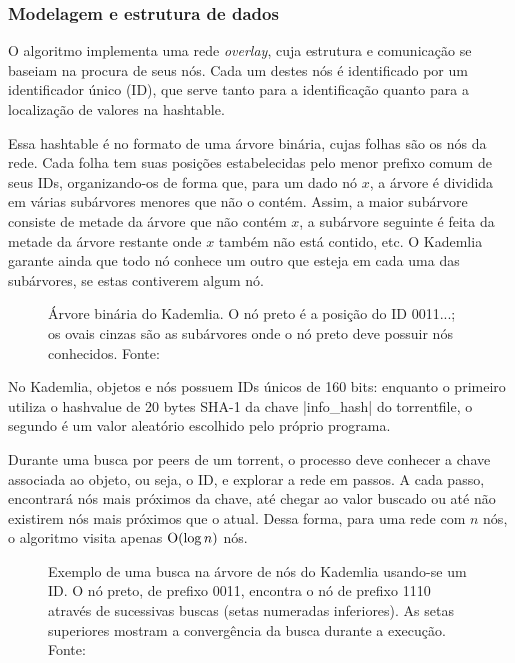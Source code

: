 
\subsubsection*{Modelagem e estrutura de dados}

O algoritmo implementa uma rede \emph{overlay}, cuja estrutura e comunicação se baseiam
na procura de seus nós. Cada um destes nós é identificado por um identificador único
(ID), que serve tanto para a identificação quanto para a localização de valores na
\gls*{hashtable}.

Essa \gls*{hashtable} é no formato de uma árvore binária, cujas folhas são os nós da
rede. Cada folha tem suas posições estabelecidas pelo menor prefixo comum de seus IDs,
organizando-os de forma que, para um dado nó $x$, a árvore é dividida em várias
subárvores menores que não o contém. Assim, a maior subárvore consiste de metade da
árvore que não contém $x$, a subárvore seguinte é feita da metade da árvore restante
onde $x$ também não está contido, etc. O Kademlia garante ainda que todo nó conhece um
outro que esteja em cada uma das subárvores, se estas contiverem algum nó.

\begin{figure}[ht!]
    \centering
    \caption{Árvore binária do Kademlia. O nó preto é a posição do ID 0011...; os ovais
    cinzas são as subárvores onde o nó preto deve possuir nós conhecidos. Fonte:
    \cite{artigo:kademlia}}
    \label{fig:dht-arvore}
\end{figure}

No Kademlia, objetos e nós possuem IDs únicos de 160 bits: enquanto o primeiro utiliza
o \gls*{hashvalue} de 20 bytes SHA-1 da chave \bverb|info_hash| do \gls*{torrentfile},
o segundo é um valor aleatório escolhido pelo próprio programa.

Durante uma busca por \glspl*{peer} de um \gls*{torrent}, o processo deve conhecer a
chave associada ao objeto, ou seja, o ID, e explorar a rede em passos. A cada passo,
encontrará nós mais próximos da chave, até chegar ao valor buscado ou até não existirem
nós mais próximos que o atual. Dessa forma, para uma rede com $n$ nós, o algoritmo
visita apenas $\textup{O}(\log n)$ nós.

\newpage
\begin{figure}[ht!]
    \centering
    \caption{Exemplo de uma busca na árvore de nós do Kademlia usando-se um ID. O nó
    preto, de prefixo 0011, encontra o nó de prefixo 1110 através de sucessivas buscas
    (setas numeradas inferiores). As setas superiores mostram a convergência da
    busca durante a execução. Fonte: \cite{artigo:kademlia}}
    \label{fig:dht-arvore-busca}
\end{figure}

